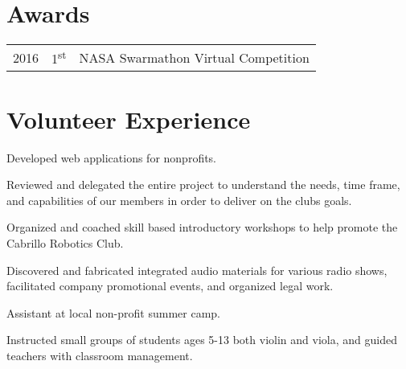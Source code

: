 \documentclass[]{deedy-resume-openfont}
\begin{document}
\begin{minipage}[t]{0.66\textwidth}

\section{Awards} 
\begin{tabular}{rll}
2016 & 1\textsuperscript{st}  & NASA Swarmathon Virtual Competition\\
\end{tabular}
\sectionsep
\section{Volunteer Experience}

\begin{tightemize}
\item Developed web applications for nonprofits. 
\item Reviewed and delegated the entire project to understand the needs, time frame, and capabilities of our members in order to deliver on the clubs goals. 
\end{tightemize}
\sectionsep


\begin{tightemize}
\item Organized and coached skill based introductory workshops to help promote the Cabrillo Robotics Club. 
\end{tightemize}
\sectionsep


\begin{tightemize}
\item Discovered and fabricated integrated audio materials for various radio shows, facilitated company promotional events, and organized legal work. 
\end{tightemize}
\sectionsep



\begin{tightemize}
\item Assistant at local non-profit summer camp. 
\item Instructed small groups of students ages 5-13 both violin and viola, and guided teachers with classroom management. 
\end{tightemize}
\sectionsep

\end{minipage} 
\end{document}
